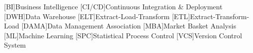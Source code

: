 
\begin{acronym}[MMMMMM]
	[BI]{Business Intelligence}
	[CI/CD]{Continuous Integration \& Deployment}
	[DWH]{Data Warehouse}
	[ELT]{Extract-Load-Transform}
	[ETL]{Extract-Transform-Load}
	[DAMA]{Data Management Association}
	[MBA]{Market Basket Analysis}
	[ML]{Machine Learning}
	[SPC]{Statistical Process Control}
	[VCS]{Version Control System}
\end{acronym}
